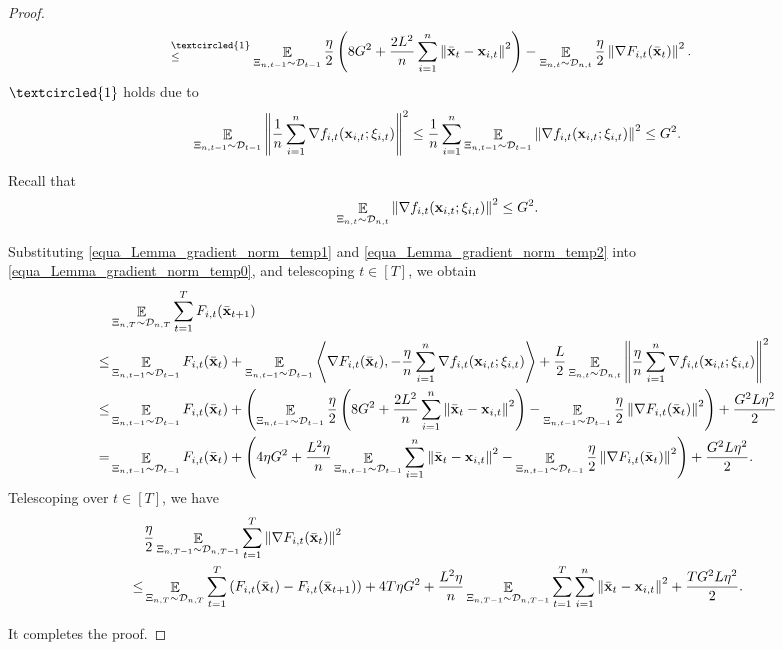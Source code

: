 \documentclass{article}
\begin{document}
\begin{proof}
\begin{align}
\refabovecir{\le}{\textcircled{1}} & \EE_{ \Xi_{n,t-1} \sim \Dcal_{t-1} } \frac{\eta}{2}\lrincir{ 8 G^2 + \frac{2L^2}{n}\sum_{i=1}^n \lrnorm{ \bar{\x}_t - \x_{i,t} }^2 }  - \EE_{ \Xi_{n,t} \sim \Dcal_{n,t} } \frac{\eta}{2} \lrnorm{\nabla F_{i,t}(\bar{\x}_t)}^2.
\end{align} $\textcircled{1}$ holds due to  
\begin{align}
\nonumber
\mathop{\mathbb{E}}_{ \Xi_{n,t-1} \sim \mathcal{D}_{t-1} }\left\lVert\frac{1}{n}\sum_{i=1}^n \nabla  f_{i,t}({\bf x}_{i,t};\xi_{i,t})\right\rVert^2 \le \frac{1}{n}\sum_{i=1}^n  \mathop{\mathbb{E}}_{ \Xi_{n,t-1} \sim \mathcal{D}_{t-1} }\left\lVert\nabla  f_{i,t}({\bf x}_{i,t};\xi_{i,t})\right\rVert^2 \le G^2.
\end{align}

Recall that
\begin{align}
\label{equa_Lemma_gradient_norm_temp2}
\mathop{\mathbb{E}}_{ \Xi_{n,t} \sim \mathcal{D}_{n,t} }\left\lVert \nabla f_{i,t}({\bf x}_{i,t};\xi_{i,t})\right\rVert^2 \le G^2.
\end{align}

Substituting \eqref{equa_Lemma_gradient_norm_temp1} and \eqref{equa_Lemma_gradient_norm_temp2} into \eqref{equa_Lemma_gradient_norm_temp0}, and telescoping $t\in[T]$, we obtain
\begin{align}
\nonumber
& \mathop{\mathbb{E}}_{ \Xi_{n,T} \sim \mathcal{D}_{n,T} } \sum_{t=1}^T F_{i,t}(\bar{{\bf x}}_{t+1}) \\ \nonumber
\le & \mathop{\mathbb{E}}_{ \Xi_{n,t-1} \sim \mathcal{D}_{t-1} } F_{i,t}(\bar{{\bf x}}_t) + \mathop{\mathbb{E}}_{ \Xi_{n,t-1} \sim \mathcal{D}_{t-1} }\left\langle\nabla F_{i,t}(\bar{{\bf x}}_t), -\frac{\eta}{n}\sum_{i=1}^n \nabla f_{i,t}({\bf x}_{i,t};\xi_{i,t}) \right\rangle + \frac{L}{2} \mathop{\mathbb{E}}_{ \Xi_{n,t} \sim \mathcal{D}_{n,t} }\left\lVert\frac{\eta}{n}\sum_{i=1}^n \nabla f_{i,t}({\bf x}_{i,t};\xi_{i,t})\right\rVert^2 \\ \nonumber
\le & \mathop{\mathbb{E}}_{ \Xi_{n,t-1} \sim \mathcal{D}_{t-1} } F_{i,t}(\bar{{\bf x}}_t) + \left(  \mathop{\mathbb{E}}_{ \Xi_{n,t-1} \sim \mathcal{D}_{t-1} } \frac{\eta}{2}\left(  8 G^2 + \frac{2L^2}{n}\sum_{i=1}^n \left\lVert \bar{{\bf x}}_t - {\bf x}_{i,t} \right\rVert^2  \right)  - \mathop{\mathbb{E}}_{ \Xi_{n,t-1} \sim \mathcal{D}_{t-1} } \frac{\eta}{2} \left\lVert\nabla F_{i,t}(\bar{{\bf x}}_t)\right\rVert^2  \right) + \frac{G^2L\eta^2}{2} \\ \nonumber
= & \mathop{\mathbb{E}}_{ \Xi_{n,t-1} \sim \mathcal{D}_{t-1} } F_{i,t}(\bar{{\bf x}}_t) + \left(   4\eta  G^2 + \frac{ L^2 \eta}{n}\mathop{\mathbb{E}}_{ \Xi_{n,t-1} \sim \mathcal{D}_{t-1} }\sum_{i=1}^n \left\lVert \bar{{\bf x}}_t - {\bf x}_{i,t} \right\rVert^2   - \mathop{\mathbb{E}}_{ \Xi_{n,t-1} \sim \mathcal{D}_{t-1} } \frac{\eta}{2} \left\lVert\nabla F_{i,t}(\bar{{\bf x}}_t)\right\rVert^2  \right) + \frac{G^2L\eta^2}{2}.
\end{align} Telescoping over $t\in[T]$, we have
\begin{align}
& \frac{\eta}{2} \mathop{\mathbb{E}}_{ \Xi_{n,T-1} \sim \mathcal{D}_{n,T-1} }\sum_{t=1}^T \left\lVert\nabla F_{i,t}(\bar{{\bf x}}_t)\right\rVert^2 \\ \nonumber
\le & \mathop{\mathbb{E}}_{ \Xi_{n,T} \sim \mathcal{D}_{n,T} } \sum_{t=1}^T  \left( F_{i,t}(\bar{{\bf x}}_t) - F_{i,t}(\bar{{\bf x}}_{t+1}) \right) + 4T  \eta G^2 + \frac{ L^2 \eta}{n}\mathop{\mathbb{E}}_{ \Xi_{n,T-1} \sim \mathcal{D}_{n,T-1} }\sum_{t=1}^T\sum_{i=1}^n \left\lVert \bar{{\bf x}}_t - {\bf x}_{i,t} \right\rVert^2 + \frac{TG^2L\eta^2}{2}.
\end{align} 





It completes the proof.
\end{proof}
\end{document}
